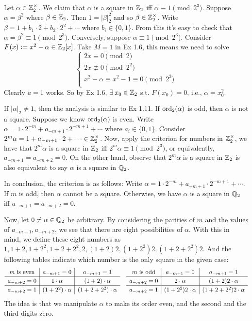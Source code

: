 \documentclass[../Koblitz.tex]{subfiles}
\begin{document}
Let $\alpha\in\mathbb{Z}_2^\times$. We claim that $\alpha$ is a square in $\mathbb{Z}_2$ iff
$\alpha\equiv 1\pmod{2^3}$. Suppose $\alpha=\beta^2$ where $\beta\in\mathbb{Z}_2$. Then $1=|\beta|_2^2$ and so $\beta\in\mathbb{Z}_2^\times$. Write $\beta=1+b_1\cdot2+b_2\cdot2^2+\cdots$ where $b_i\in\{0,1\}$. From this it's easy to check that $\alpha=\beta^2\equiv 1\pmod{2^3}$. Conversely, suppose $\alpha\equiv1\pmod{2^3}$. Consider $F(x):=x^2-\alpha\in\mathbb{Z}_2[x]$. Take $M=1$ in Ex 1.6, this means we need to solve
$$
\begin{cases*}
2x \equiv0\pmod{2} \\
2x \not\equiv0\pmod{2^2} \\
x^2-\alpha \equiv x^2-1 \equiv0 \pmod{2^3} \\
\end{cases*}
$$
Clearly $a=1$ works. So by Ex 1.6, $\exists x_0\in\ZZ_2$ s.t. $F(x_0)=0$, i.e., $\alpha=x_0^2$.

If $|\alpha|_2\neq 1$, then the analysis is similar to Ex 1.11. If $\operatorname{ord}_2(\alpha)$ is odd, then $\alpha$ is not a square. Suppose we know $\operatorname{ord}_2(\alpha)$ is even. Write $\alpha=1\cdot2^{-m}+a_{-m+1}\cdot2^{-m+1}+\cdots$ where $a_i\in\{0,1\}$. Consider $2^m\alpha =1+a_{-m+1}\cdot2+\cdots \in\mathbb{Z}_2^\times$. Now, apply the criterion for numbers in $\mathbb{Z}_2^\times$, we have that $2^m\alpha$ is a square in $\mathbb{Z}_2$ iff $2^m\alpha\equiv 1 \pmod{2^3}$, or equivalently, $a_{-m+1}=a_{-m+2}=0$. On the other hand, observe that $2^m\alpha$ is a square in $\mathbb{Z}_2$ is also equivalent to say $\alpha$ is a square in $\mathbb{Q}_2$.

In conclusion, the criterion is as follows: Write $\alpha=1\cdot2^{-m}+a_{-m+1}\cdot2^{-m+1}+\cdots$. If $m$ is odd, then $\alpha$ cannot be a square. Otherwise, we have $\alpha$ is a square in $\mathbb{Q}_2$ iff $a_{-m+1}=a_{-m+2}=0$.

Now, let $0\neq\alpha\in\mathbb{Q}_2$ be arbitrary. By considering the parities of $m$ and the values of $a_{-m+1},a_{-m+2}$, we see that there are eight possibilities of $\alpha$. With this in mind, we define these eight numbers as $1,1+2,1+2^2,1+2+2^2,2,(1+2)2,(1+2^2)2,(1+2+2^2)2$. And the following tables indicate which number is the only square in the given case:
$$
\def\arraystretch{1.2}
\begin{array}{c|c|c}
m \text{ is even} & a_{-m+1}=0 & a_{-m+1}=1 \\
\hline
a_{-m+2}=0 & 1\cdot\alpha & (1+2)\cdot\alpha \\
\hline
a_{-m+2}=1 & (1+2^2)\cdot\alpha & (1+2+2^2)\cdot\alpha
\end{array}
\quad
\begin{array}{c|c|c}
m \text{ is odd} & a_{-m+1}=0 & a_{-m+1}=1 \\
\hline
a_{-m+2}=0 & 2\cdot\alpha & (1+2)2\cdot\alpha \\
\hline
a_{-m+2}=1 & (1+2^2)2\cdot\alpha & (1+2+2^2)2\cdot\alpha
\end{array}
$$
The idea is that we manipulate $\alpha$ to make its order even, and the second and the third digits zero.
\end{document}
